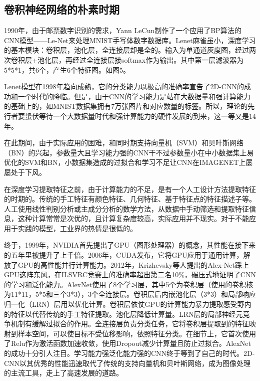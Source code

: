 \documentclass[15pt]{article}
\begin{document}
\subsection{卷积神经网络的朴素时期}
1990年，由于邮票数字识别的需求，Yann LeCun制作了一个应用了BP算法的CNN模型——Le-Net\cite{ref26}来处理MNIST手写体数字数据库\cite{ref27}。Lenet麻雀虽小，深度学习的基本模块：卷积层，池化层，全连接层却是全的。输入为单通道灰度图，经过两次卷积层+池化层，再经过全连接层接softmax作为输出。其中第一层滤波器为5*5*1，共6个，产生6个特征图。如图5。

Lenet模型在1998年趋向成熟，它的分类能力以极高的准确率宣告了2D-CNN的成功\cite{ref28}和一个时代的降临。但是，由于CNN的学习能力是站在大数据量和强计算能力的基础上的，如MNIST数据集拥有7万张图片和对应数量的标签。所以，理论的先行者要蛰伏等待一个大数据量时代和强计算能力的硬件发展的到来，这一等又是14年。

在此期间，由于实际应用的困难，和同时期支持向量机（SVM）\cite{ref29,ref30,ref31,ref32,ref33}和贝叶斯网络（BN）\cite{ref34,ref35}的兴起，参数量大且学习能力强的CNN干不过参数量小在中小数据集上易优化的SVM和BN，小数据集造成的过拟合和学习不足让CNN在IMAGENET上屡屡处于下风。

在深度学习提取特征之前，由于计算能力的不足，是有一个人工设计方法提取特征的时期的。传统的手工特征有颜色特征、几何特征、基于特征点的特征描述子等\cite{ref36,ref37}。人工使用线性判别分析或主成分分析的数学方法，从数据中手动筛选和提取特征信息，这种计算常常是次优的，且计算复杂度较高，实际应用并不现实。对于不能应用于实践的模型，工业界的热情是很低的。

终于，1999年，NVIDIA首先提出了GPU（图形处理器）的概念，其性能在接下来的五年里被提升了上千倍。2006年，CUDA发布，它将GPU应用于通用计算，解放了GPU的高性能并行计算能力。2012年，Krizhevsky等人提出的Alex-Net\cite{ref38}踩上GPU这阵东风，在ILSVRC竞赛上的准确率超出第二名10\%，碾压式地证明了CNN的学习和泛化能力。AlexNet使用了8个学习层，其中5个为卷积层（使用的卷积核为11*11，5*5和三个3*3），3个全连接层。卷积层后内嵌池化层（3*3）和局部响应归一化（LRN）层用以优化计算。卷积层依仗GPU的计算能力暴力提取感受野内的特征以代替传统的手工特征提取。池化层降低计算量。LRN层的局部神经元竞争机制有缓解过拟合的作用。全连接层负责分类任务，它将卷积层提取到的特征映射到样本空间，可以使目标不受位移影响，依照特征分类。在细节上，它首次使用了Relu作为激活函数加速收敛，使用Dropout减少计算量且防止过拟合。AlexNet的成功十分引人注目。学习能力强泛化能力强的CNN终于等到了自己的时代。2D-CNN以其优秀的性能迅速取代了传统的支持向量机和贝叶斯网络，成为图像处理的主流工具，走上了高速发展的道路。
\end{document}
